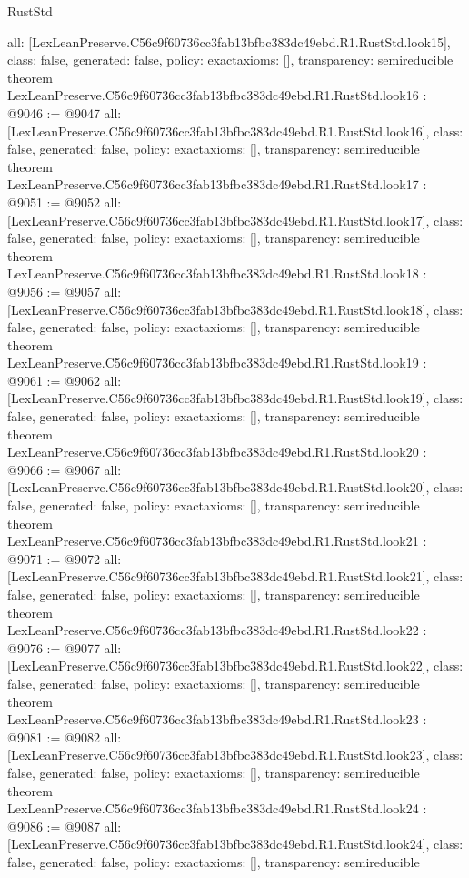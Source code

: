 \begin{lexlean}{RustStd}
\begin{coremodule}
{  all: [LexLeanPreserve.C56c9f60736cc3fab13bfbc383dc49ebd.R1.RustStd.look15],
  class: false,
  generated: false,
  policy: exact{axioms: []},
  transparency: semireducible
}
theorem LexLeanPreserve.C56c9f60736cc3fab13bfbc383dc49ebd.R1.RustStd.look16 : @9046 := @9047 {
  all: [LexLeanPreserve.C56c9f60736cc3fab13bfbc383dc49ebd.R1.RustStd.look16],
  class: false,
  generated: false,
  policy: exact{axioms: []},
  transparency: semireducible
}
theorem LexLeanPreserve.C56c9f60736cc3fab13bfbc383dc49ebd.R1.RustStd.look17 : @9051 := @9052 {
  all: [LexLeanPreserve.C56c9f60736cc3fab13bfbc383dc49ebd.R1.RustStd.look17],
  class: false,
  generated: false,
  policy: exact{axioms: []},
  transparency: semireducible
}
theorem LexLeanPreserve.C56c9f60736cc3fab13bfbc383dc49ebd.R1.RustStd.look18 : @9056 := @9057 {
  all: [LexLeanPreserve.C56c9f60736cc3fab13bfbc383dc49ebd.R1.RustStd.look18],
  class: false,
  generated: false,
  policy: exact{axioms: []},
  transparency: semireducible
}
theorem LexLeanPreserve.C56c9f60736cc3fab13bfbc383dc49ebd.R1.RustStd.look19 : @9061 := @9062 {
  all: [LexLeanPreserve.C56c9f60736cc3fab13bfbc383dc49ebd.R1.RustStd.look19],
  class: false,
  generated: false,
  policy: exact{axioms: []},
  transparency: semireducible
}
theorem LexLeanPreserve.C56c9f60736cc3fab13bfbc383dc49ebd.R1.RustStd.look20 : @9066 := @9067 {
  all: [LexLeanPreserve.C56c9f60736cc3fab13bfbc383dc49ebd.R1.RustStd.look20],
  class: false,
  generated: false,
  policy: exact{axioms: []},
  transparency: semireducible
}
theorem LexLeanPreserve.C56c9f60736cc3fab13bfbc383dc49ebd.R1.RustStd.look21 : @9071 := @9072 {
  all: [LexLeanPreserve.C56c9f60736cc3fab13bfbc383dc49ebd.R1.RustStd.look21],
  class: false,
  generated: false,
  policy: exact{axioms: []},
  transparency: semireducible
}
theorem LexLeanPreserve.C56c9f60736cc3fab13bfbc383dc49ebd.R1.RustStd.look22 : @9076 := @9077 {
  all: [LexLeanPreserve.C56c9f60736cc3fab13bfbc383dc49ebd.R1.RustStd.look22],
  class: false,
  generated: false,
  policy: exact{axioms: []},
  transparency: semireducible
}
theorem LexLeanPreserve.C56c9f60736cc3fab13bfbc383dc49ebd.R1.RustStd.look23 : @9081 := @9082 {
  all: [LexLeanPreserve.C56c9f60736cc3fab13bfbc383dc49ebd.R1.RustStd.look23],
  class: false,
  generated: false,
  policy: exact{axioms: []},
  transparency: semireducible
}
theorem LexLeanPreserve.C56c9f60736cc3fab13bfbc383dc49ebd.R1.RustStd.look24 : @9086 := @9087 {
  all: [LexLeanPreserve.C56c9f60736cc3fab13bfbc383dc49ebd.R1.RustStd.look24],
  class: false,
  generated: false,
  policy: exact{axioms: []},
  transparency: semireducible
}
\end{coremodule}
\end{lexlean}
